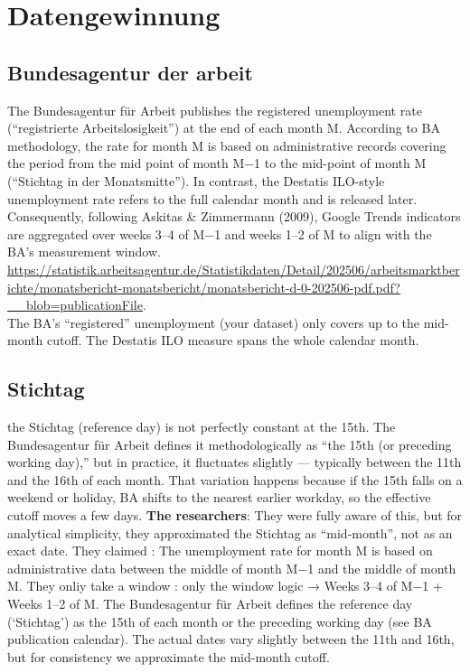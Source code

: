 \documentclass{article}
\begin{document}
\section{Datengewinnung}
\subsection{Bundesagentur der arbeit}
The Bundesagentur für Arbeit publishes the registered unemployment rate (“registrierte Arbeitslosigkeit”) at the end of each month M.
According to BA methodology, the rate for month M is based on administrative records covering the period from the mid point of month M−1 to the mid-point of month M (“Stichtag in der Monatsmitte”).
In contrast, the Destatis ILO-style unemployment rate refers to the full calendar month and is released later.
Consequently, following Askitas & Zimmermann (2009), Google Trends indicators are aggregated over weeks 3–4 of M−1 and weeks 1–2 of M to align with the BA’s measurement window. \url{https://statistik.arbeitsagentur.de/Statistikdaten/Detail/202506/arbeitsmarktberichte/monatsbericht-monatsbericht/monatsbericht-d-0-202506-pdf.pdf?__blob=publicationFile}.
\\
The BA’s “registered” unemployment (your dataset) only covers up to the mid-month cutoff.
The Destatis ILO measure spans the whole calendar month.

\subsection{Stichtag}
the Stichtag (reference day) is not perfectly constant at the 15th.
The Bundesagentur für Arbeit defines it methodologically as “the 15th (or preceding working day),”
but in practice, it fluctuates slightly — typically between the 11th and the 16th of each month.
That variation happens because if the 15th falls on a weekend or holiday, BA shifts to the nearest earlier workday, so the effective cutoff moves a few days.
\textbf{The researchers}: They were fully aware of this, but for analytical simplicity, they approximated the Stichtag as “mid-month”, not as an exact date. They claimed : The unemployment rate for month M is based on administrative data between the middle of month M−1 and the middle of month M. They onliy take a window : only the window logic
→ Weeks 3–4 of M−1 + Weeks 1–2 of M.
The Bundesagentur für Arbeit defines the reference day (‘Stichtag’) as the 15th of each month or the preceding working day (see BA publication calendar). The actual dates vary slightly between the 11th and 16th, but for consistency we approximate the mid-month cutoff.
\end{document}
